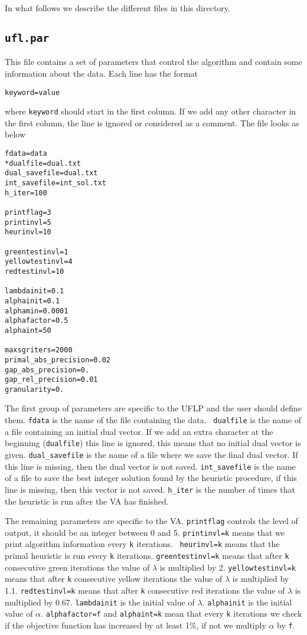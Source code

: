 \documentclass{article}
\begin{document}
In what follows we describe the different files in this directory.


\subsection{{\tt ufl.par}}

This file contains a set of parameters that control the algorithm and contain
some information about the data. Each line has the format

{\tt keyword=value}

\noindent where {\tt keyword} should start in the first column. If we add any
other character in the first column, the line is ignored or considered as a
comment. The file looks as below

\bigskip
\begin{verbatim}
fdata=data
*dualfile=dual.txt
dual_savefile=dual.txt
int_savefile=int_sol.txt
h_iter=100

printflag=3
printinvl=5
heurinvl=10

greentestinvl=1
yellowtestinvl=4
redtestinvl=10

lambdainit=0.1
alphainit=0.1
alphamin=0.0001
alphafactor=0.5
alphaint=50

maxsgriters=2000
primal_abs_precision=0.02
gap_abs_precision=0.
gap_rel_precision=0.01
granularity=0.
\end{verbatim}

The first group of parameters are specific to the UFLP and the user should
define them. {\tt fdata} is the name of the file containing the data. {\tt
dualfile} is the name of a file containing an initial dual vector. If we add
an extra character at the beginning ({\tt *dualfile}) this line is ignored,
this means that no initial dual vector is given. {\tt dual\_savefile} is the
name of a file where we save the final dual vector. If this line is missing,
then the dual vector is not saved. {\tt int\_savefile} is the name of a file
to save the best integer solution found by the heuristic procedure, if this
line is missing, then this vector is not saved. {\tt h\_iter} is the number of
times that the heuristic is run after the VA has finished.

The remaining parameters are specific to the VA. {\tt printflag} controls the
level of output, it should be an integer between 0 and 5. {\tt printinvl=k}
means that we print algorithm information every {\tt k} iterations. {\tt
heurinvl=k} means that the primal heuristic is run every {\tt k} iterations.
{\tt greentestinvl=k} means that after {\tt k} consecutive green iterations
the value of $\lambda$ is multiplied by 2. {\tt yellowtestinvl=k} means that
after {\tt k} consecutive yellow iterations the value of $\lambda$ is
multiplied by 1.1. {\tt redtestinvl=k} means that after {\tt k} consecutive
red iterations the value of $\lambda$ is multiplied by 0.67. {\tt lambdainit}
is the initial value of $\lambda$. {\tt alphainit} is the initial value of
$\alpha$. {\tt alphafactor=f} and {\tt alphaint=k} mean that every {\tt k}
iterations we check if the objective function has increased by at least 1\%,
if not we multiply $\alpha$ by {\tt f}.
\end{document}
